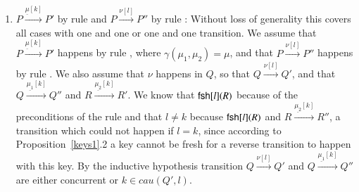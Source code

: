 \begin{subappendices}
\begin{pf}
\begin{enumerate}
\begin{enumerate}
\begin{enumerate}
\begin{enumerate}
\end{enumerate}
\item $P \xrightarrow{\underline{\mu}[k]} P'$ by rule  and $P \xrightarrow{\nu[l]} P''$ by rule : Without loss of generality this covers all cases with one 
and one  or one  and one  transition. We assume that $P \xrightarrow{\underline{\mu}[k]} P'$ happens by rule 
, where $\gamma(\mu_1,\mu_2)=\mu$, and that $P \xrightarrow{\nu[l]} P''$ happens by rule 
		. We also assume that $\nu$ happens in $Q$, so that $Q \xrightarrow{\nu[l]} Q'$, and that $Q \xrightarrow{\underline{\mu_1}[k]} Q''$ and $R \xrightarrow{\underline{\mu_2}[k]} R'$. We know that $\mathsf{fsh}[l](R)$ because of the preconditions of the  rule and that $l \neq k$ because $\mathsf{fsh}[l](R)$ and $R \xrightarrow{\underline{\mu_2}[k]} R''$, a transition which could not happen if $l=k$, since according to Proposition~\ref{keys1}.2 a key cannot be fresh for a reverse transition to happen with this key. By the inductive hypothesis transition $Q \xrightarrow{\nu[l]} Q'$ and $Q \xrightarrow{\underline{\mu_1}[k]} Q''$ are either concurrent or $k \in cau(Q',l)$.


\end{enumerate}
\end{enumerate}
\end{enumerate}
\end{pf}
\end{subappendices}
